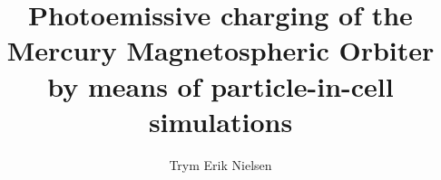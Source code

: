 \documentclass[a4paper, american]{memoir}
\title{Photoemissive charging of the Mercury Magnetospheric Orbiter by means of particle-in-cell simulations}
\author{Trym Erik Nielsen}
\begin{document}
    \frontmatter        %

    \masterfrontpage
    
    
    

    \cleartorecto
    \tableofcontents    %
    \cleartorecto
    \listoffigures      %
    \cleartorecto
    \listoftables       %

    \mainmatter         %

    
    
    
    
    
    
    

    \appendix           %
    \appendixpage       %

    
    
    

    \backmatter         %

    \printbibliography
\end{document}
